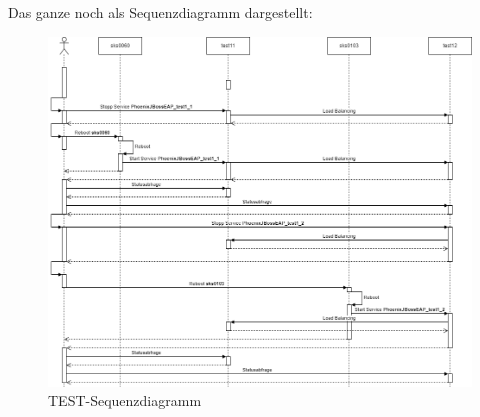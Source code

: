 \begin{flushleft}
    Das ganze noch als Sequenzdiagramm dargestellt:
    \begin{figure}[H]
        \centering
        \includegraphics[width=1\linewidth]{source/test/sequenzdiagramm_test}
        \caption{TEST-Sequenzdiagramm}
        \label{fig:test-sequenzdiagramm}
    \end{figure}
\end{flushleft}
\begin{flushleft}

\end{flushleft}
